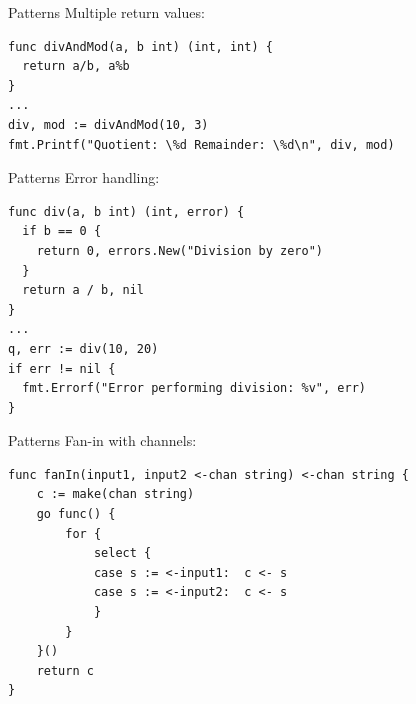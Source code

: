 \documentclass[pdf,xcolor=dvipsnames,noparindent]{beamer}
\begin{document}
\begin{frame}[fragile]{Patterns}
  Multiple return values:
  \pause
\begin{verbatim}
func divAndMod(a, b int) (int, int) {
  return a/b, a%b
}
...
div, mod := divAndMod(10, 3)
fmt.Printf("Quotient: \%d Remainder: \%d\n", div, mod)
\end{verbatim}
  
\end{frame}

\begin{frame}[fragile]{Patterns}
  Error handling:
  \pause
\begin{verbatim}
func div(a, b int) (int, error) {
  if b == 0 {
    return 0, errors.New("Division by zero")
  }
  return a / b, nil
}
...
q, err := div(10, 20)
if err != nil {
  fmt.Errorf("Error performing division: %v", err)
}
\end{verbatim}
\end{frame}

\begin{frame}[fragile]{Patterns}
  Fan-in with channels:
  \pause
\begin{verbatim}
func fanIn(input1, input2 <-chan string) <-chan string {
    c := make(chan string)
    go func() {
        for {
            select {
            case s := <-input1:  c <- s
            case s := <-input2:  c <- s
            }
        }
    }()
    return c
}
\end{verbatim}
\end{frame}
\end{document}
